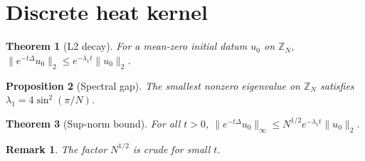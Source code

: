 \documentclass{article}
\newtheorem{theorem}{Theorem}[section]
\newtheorem{proposition}[theorem]{Proposition}
\newtheorem*{remark}{Remark}
\begin{document}
\section{Discrete heat kernel}\label{sec:heat}
\begin{theorem}[L2 decay]\label{thm:decay}
For a mean-zero initial datum $u_0$ on $\mathbb{Z}_N$, $\|e^{-t\Delta} u_0\|_2 \le e^{-\lambda_1 t}\|u_0\|_2$.
\end{theorem}
\begin{proposition}[Spectral gap]\label{prop:gap}
The smallest nonzero eigenvalue on $\mathbb{Z}_N$ satisfies $\lambda_1 = 4\sin^2(\pi/N)$.
\end{proposition}
\begin{theorem}[Sup-norm bound]\label{thm:sup}
For all $t>0$, $\|e^{-t\Delta} u_0\|_\infty \le N^{1/2} e^{-\lambda_1 t}\|u_0\|_2$.
\end{theorem}
\begin{remark}
The factor $N^{1/2}$ is crude for small $t$.
\end{remark}
\end{document}
